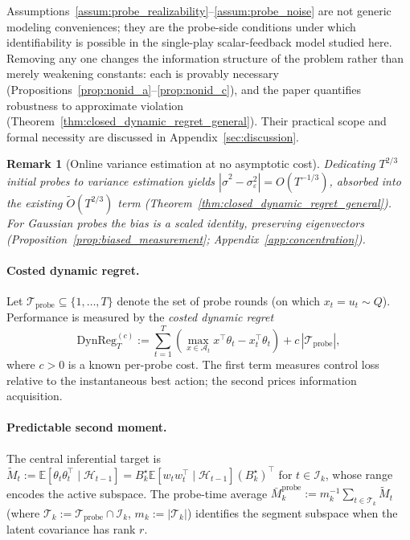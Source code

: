 \documentclass{article}
\newcommand{\E}{\mathbb{E}}
\newcommand{\cA}{\mathcal{A}}
\newcommand{\cH}{\mathcal{H}}
\newcommand{\cT}{\mathcal{T}}
\newcommand{\cI}{\mathcal{I}}
\newcommand{\cTprobe}{\mathcal{T}_{\mathrm{probe}}}
\newcommand{\DynReg}{\mathrm{DynReg}}
\newtheorem{remark}{Remark}
\begin{document}
Assumptions~\ref{assum:probe_realizability}--\ref{assum:probe_noise} are not generic modeling conveniences; they are the probe-side conditions under which identifiability is possible in the single-play scalar-feedback model studied here. Removing any one changes the information structure of the problem rather than merely weakening constants: each is provably necessary (Propositions~\ref{prop:nonid_a}--\ref{prop:nonid_c}), and the paper quantifies robustness to approximate violation (Theorem~\ref{thm:closed_dynamic_regret_general}). Their practical scope and formal necessity are discussed in Appendix~\ref{sec:discussion}.
\begin{remark}[Online variance estimation at no asymptotic cost]
  \label{rem:burnin_free}
  Dedicating $T^{2/3}$ initial probes to variance estimation yields
  $|\hat\sigma^2 - \sigma_\varepsilon^2| = O(T^{-1/3})$, absorbed into the existing $\widetilde{O}(T^{2/3})$ term
  (Theorem~\ref{thm:closed_dynamic_regret_general}). For Gaussian probes the bias is a scaled identity, preserving eigenvectors (Proposition~\ref{prop:biased_measurement}; Appendix~\ref{app:concentration}).
  \end{remark}

\paragraph{Costed dynamic regret.}
Let $\cTprobe \subseteq \{1, \ldots, T\}$ denote the set of probe rounds (on which $x_t = u_t \sim Q$).
Performance is measured by the \emph{costed dynamic regret}
\begin{equation}
  \DynReg_T^{(c)} := \sum_{t=1}^T \left(\max_{x \in \cA_t} x^\top \theta_t - x_t^\top \theta_t\right) + c\,|\cTprobe|,
  \label{eq:costed_regret}
\end{equation}
where $c > 0$ is a known per-probe cost.
The first term measures control loss relative to the instantaneous best action; the second prices information acquisition.

\paragraph{Predictable second moment.} The central inferential target is $\widetilde{M}_t := \E[\theta_t \theta_t^\top \mid \cH_{t-1}] = B_k^\star \E[w_t w_t^\top \mid \cH_{t-1}] (B_k^\star)^\top$ for $t \in \cI_k$, whose range encodes the active subspace. The probe-time average $\bar{M}_k^{\mathrm{probe}} := m_k^{-1} \sum_{t \in \cT_k} \widetilde{M}_t$ (where $\cT_k := \cTprobe \cap \cI_k$, $m_k := |\cT_k|$) identifies the segment subspace when the latent covariance has rank $r$.
\end{document}
